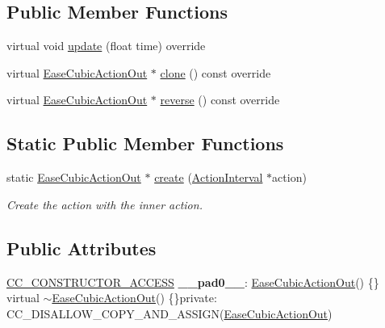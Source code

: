 \subsection*{Public Member Functions}
\begin{DoxyCompactItemize}
\item 
virtual void \hyperlink{classEaseCubicActionOut_a2bebf38d7167886e1ae4643b92e05d72}{update} (float time) override
\item 
virtual \hyperlink{classEaseCubicActionOut}{Ease\+Cubic\+Action\+Out} $\ast$ \hyperlink{classEaseCubicActionOut_a477348e29bfcbe3bfd4766398aaefed8}{clone} () const override
\item 
virtual \hyperlink{classEaseCubicActionOut}{Ease\+Cubic\+Action\+Out} $\ast$ \hyperlink{classEaseCubicActionOut_a739aa8e9008ddd302ac95eb64c804d11}{reverse} () const override
\end{DoxyCompactItemize}
\subsection*{Static Public Member Functions}
\begin{DoxyCompactItemize}
\item 
static \hyperlink{classEaseCubicActionOut}{Ease\+Cubic\+Action\+Out} $\ast$ \hyperlink{classEaseCubicActionOut_a32183dafa37c3fd06f59fa9b567dba38}{create} (\hyperlink{classActionInterval}{Action\+Interval} $\ast$action)
\begin{DoxyCompactList}\small\item\em Create the action with the inner action. \end{DoxyCompactList}\end{DoxyCompactItemize}
\subsection*{Public Attributes}
\begin{DoxyCompactItemize}
\item 
\mbox{\label{classEaseCubicActionOut_a5e2b91b1fd42f326b2e1be5ea34d724b}} 
\hyperlink{_2cocos2d_2cocos_2base_2ccConfig_8h_a25ef1314f97c35a2ed3d029b0ead6da0}{C\+C\+\_\+\+C\+O\+N\+S\+T\+R\+U\+C\+T\+O\+R\+\_\+\+A\+C\+C\+E\+SS} {\bfseries \+\_\+\+\_\+pad0\+\_\+\+\_\+}\+: \hyperlink{classEaseCubicActionOut}{Ease\+Cubic\+Action\+Out}() \{\} virtual $\sim$\hyperlink{classEaseCubicActionOut}{Ease\+Cubic\+Action\+Out}() \{\}private\+: C\+C\+\_\+\+D\+I\+S\+A\+L\+L\+O\+W\+\_\+\+C\+O\+P\+Y\+\_\+\+A\+N\+D\+\_\+\+A\+S\+S\+I\+GN(\hyperlink{classEaseCubicActionOut}{Ease\+Cubic\+Action\+Out})
\end{DoxyCompactItemize}
